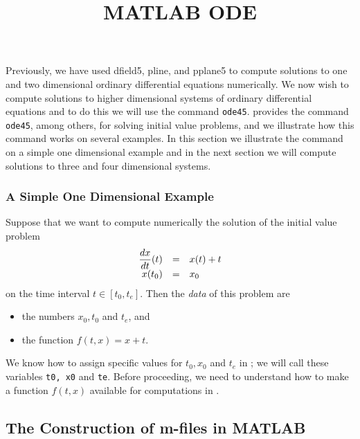 \documentclass{ximera}
\title{MATLAB ODE}
\begin{document}
\begin{abstract}
\end{abstract}
\maketitle

\label{S:ode45}

Previously, we have used {\sf dfield5}, {\sf pline}, and {\sf pplane5}
to compute solutions to one and two dimensional ordinary differential
equations numerically.  We now wish to compute solutions to higher dimensional
systems of ordinary differential equations and to do this we will use the 
\Matlab command {\tt ode45}.  \Matlab provides the 
command {\tt ode45}, among others, for solving initial value problems, and we 
illustrate how this command works on several examples.  In this section we 
illustrate the command on a simple one dimensional example and in the next
section we will compute solutions to three and four dimensional systems.

\subsubsection*{A Simple One Dimensional Example}

Suppose that we want to compute numerically the solution of the initial value 
problem
\arraystart
\begin{equation}   \label{eq:fexam}
\begin{array}{rcl}
\displaystyle \frac{dx}{dt}(t) & = & x(t)+t \\
x(t_0) & = & x_0
\end{array}
\end{equation}
\arrayfinish
on the time interval $t\in [t_0,t_e]$.  Then the {\em data\/} of this 
problem are 
\begin{itemize}
\item the numbers $x_0,t_0$ and $t_e$, and 
\item the function $f(t,x)=x+t$.  
\end{itemize}
We know how to assign specific values for $t_0,x_0$ and $t_e$ in \Matlabp;
we will call these variables {\tt t0, x0} and {\tt te}.  Before proceeding, 
we need to understand how to make a function $f(t,x)$ available for 
computations in \Matlabp.

\subsection*{The Construction of m-files in MATLAB}
\end{document}
